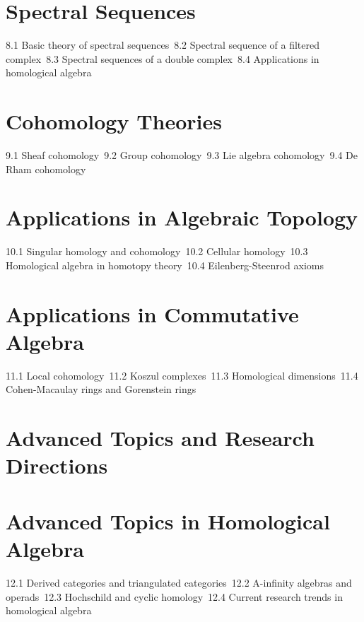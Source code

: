 \section{Spectral Sequences}
8.1 Basic theory of spectral sequences\
8.2 Spectral sequence of a filtered complex\
8.3 Spectral sequences of a double complex\
8.4 Applications in homological algebra\
\section{Cohomology Theories}
9.1 Sheaf cohomology\
9.2 Group cohomology\
9.3 Lie algebra cohomology\
9.4 De Rham cohomology\
\section{Applications in Algebraic Topology}
10.1 Singular homology and cohomology\
10.2 Cellular homology\
10.3 Homological algebra in homotopy theory\
10.4 Eilenberg-Steenrod axioms\
\section{Applications in Commutative Algebra}
11.1 Local cohomology\
11.2 Koszul complexes\
11.3 Homological dimensions\
11.4 Cohen-Macaulay rings and Gorenstein rings\
\section{Advanced Topics and Research Directions}
\section{Advanced Topics in Homological Algebra}
12.1 Derived categories and triangulated categories\
12.2 A-infinity algebras and operads\
12.3 Hochschild and cyclic homology\
12.4 Current research trends in homological algebra\
